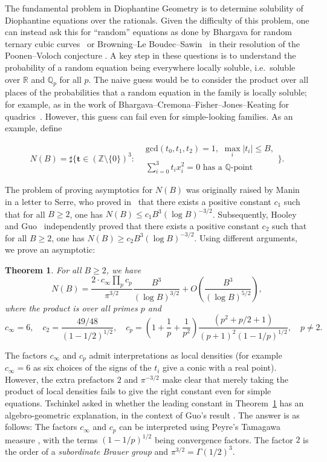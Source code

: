 \documentclass[a4paper,12pt,reqno]{amsart}
\numberwithin{equation}{section} \numberwithin{figure}{section}
\newcommand\Z{\mathbb{Z}}
\newcommand\Q{\mathbb{Q}}
\newcommand\R{\mathbb{R}}
\renewcommand{\l}{\left}
\renewcommand{\r}{\right}
\renewcommand{\b}{\mathbf}
\renewcommand{\gcd}{\textrm{gcd}}
\renewcommand{\leq}{\leqslant}
\renewcommand{\geq}{\geqslant}
\renewcommand{\#}{\sharp}
\newtheorem{theorem}[lemma]{Theorem}
\theoremstyle{definition}
\numberwithin{lemma}{section}
\newcommand{\beq}[2]
{
\begin{equation}
\label{#1}
{#2}
\end{equation}
}
\begin{document}
 
The  fundamental problem in Diophantine Geometry is to determine solubility of Diophantine equations over the rationals.
Given the difficulty of this problem, one can instead ask this for ``random'' equations
as done by  
Bhargava for  random ternary cubic curves~\cite{Bha14}
or
Browning--Le Boudec--Sawin~\cite{boudec}
in their 
 resolution of the 
Poonen--Voloch conjecture \cite{PV04}.
A key step in  these questions 
 is to understand the probability 
of a random equation being everywhere locally soluble, i.e.~soluble over $\R$ and $\Q_p$ for all $p$. The naive guess would be to consider the product over all places 
of the probabilities that a random equation in the family is locally soluble; for example, as in the work of 
 Bhargava--Cremona--Fisher--Jones--Keating for quadrics~\cite{MR3544620}. However, this guess
can fail even for simple-looking families.
As an example,
define 
\beq{def:nalphax}{
 N(B)
= \#\bigg\{\b t \in (\Z\setminus\{0\} )^3: 
\begin{array}{ll}
& \gcd(t_0,t_1,t_2) = 1, \,\, \max_i|t_i| \leq B, \\
& \sum_{i=0}^3 t_i x_i^2=0 \textrm{ has a }\Q\textrm{-point}
\end{array}
\bigg\}.
}
The problem of 
proving asymptotics for $N(B)$ was originally 
raised by Manin in a letter to Serre, who proved in~\cite[page 399]{Ser90} 
that there exists a positive constant $c_1$ such that for all $B\geq 2 $, one has 
 $ N(B) \leq c_1  B^3 (\log B)^{-3/2}$. Subsequently, Hooley~\cite{Hoo93} and Guo~\cite{Guo95}
independently proved that   there exists a positive constant $c_2$ such that for all $B\geq 2 $, one has 
 $ N(B) \geq c_2  B^3 (\log B)^{-3/2}$. Using different arguments, we prove an asymptotic:

\begin{theorem}
\label{thm:main}
 For all $B\geq 2 $,  we have 
$$
N(B) = \frac{2 \cdot c_\infty \prod_p c_p}{\pi^{3/2}   }  
 \frac{B^3}{(\log B)^{3/2}}+O\l(\frac{B^3}{(\log B)^{5/2}}  \r),$$
 where the product is over all primes $p$ and 
$$
c_\infty = 6, \quad c_2 = \frac{49/48}{(1-1/2)^{1/2}}, \quad
c_p = 
\l(1+\frac{1}{p}+ \frac{1}{p^2} \r)
 \frac{    ( p^2 + p/2 + 1 )}{    (p + 1)^2   (1-1/p )^{1/2} }, \quad p \neq 2.$$
 \end{theorem} 
 
The factors $c_\infty$ and $c_p$ admit interpretations as local densities (for example $c_\infty = 6$ as six choices of the signs of the $t_i$ give a conic with a real point). However, the extra prefactors $2$ and $\pi^{-3/2}$ make clear that merely taking the product of local densities fails to give the right constant even for simple equations.  Tschinkel asked  in \cite[\S 2.1]{Tsc09} whether the leading constant in Theorem~\ref{thm:main} has an algebro-geometric explanation, in the context of Guo's result \cite{Guo95}.  The answer is as follows: The factors $c_\infty$ and $c_p$ can be interpreted using Peyre's Tamagawa measure \cite{Pey95}, with the terms $(1-1/p)^{1/2}$ being convergence factors.
The factor $2$ is the order of a \textit{subordinate Brauer group}
and $\pi^{3/2} =\Gamma(1/2)^{3}$. 
\end{document}
